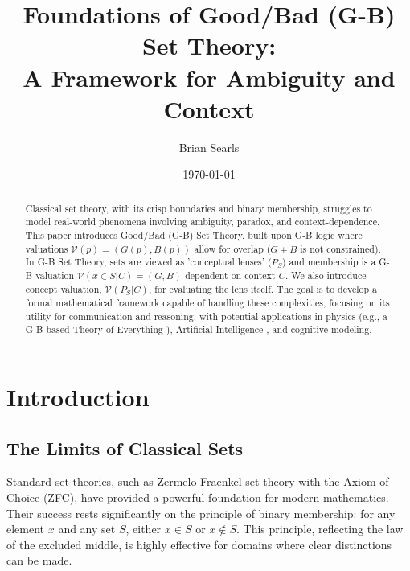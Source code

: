 \documentclass[11pt]{article}
\newcommand{\gbval}[1]{\mathcal{V}(#1)}         %
\newcommand{\gcomp}[1]{G(#1)}                   %
\newcommand{\bcomp}[1]{B(#1)}                   %
\newcommand{\pset}[1]{P_{#1}}                   %
\theoremstyle{definition}
\theoremstyle{plain}
\begin{document}
\title{Foundations of Good/Bad (G-B) Set Theory: \\ A Framework for Ambiguity and Context}
\author{Brian Searls}
\date{\today}
\maketitle

\begin{abstract}
Classical set theory, with its crisp boundaries and binary membership, struggles to model real-world phenomena involving ambiguity, paradox, and context-dependence. This paper introduces Good/Bad (G-B) Set Theory, built upon G-B logic \cite{gb_logic_paper} where valuations $\gbval{p} = (\gcomp{p}, \bcomp{p})$ allow for overlap ($G+B$ is not constrained). In G-B Set Theory, sets are viewed as 'conceptual lenses' ($\pset{S}$) and membership is a G-B valuation $\gbval{x \in S | C} = (G, B)$ dependent on context $C$. We also introduce concept valuation, $\gbval{\pset{S}|C}$, for evaluating the lens itself. The goal is to develop a formal mathematical framework capable of handling these complexities, focusing on its utility for communication and reasoning, with potential applications in physics (e.g., a G-B based Theory of Everything \cite{gb_toe_outline}), Artificial Intelligence \cite{gb_ai_outline}, and cognitive modeling.
\end{abstract}

\tableofcontents
\newpage

\section{Introduction}

\subsection{The Limits of Classical Sets}
Standard set theories, such as Zermelo-Fraenkel set theory with the Axiom of Choice (ZFC), have provided a powerful foundation for modern mathematics. Their success rests significantly on the principle of binary membership: for any element $x$ and any set $S$, either $x \in S$ or $x \notin S$. This principle, reflecting the law of the excluded middle, is highly effective for domains where clear distinctions can be made.
\end{document}
